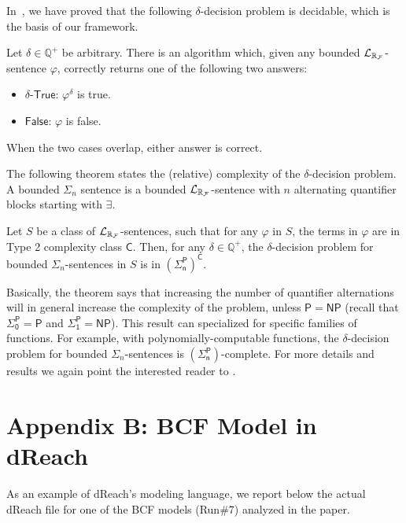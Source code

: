 In~\cite{gao12a}, we have proved that the following $\delta$-decision problem is decidable, which is the basis of our framework.
\begin{theorem}\label{delta-decide} Let $\delta\in\mathbb{Q}^+$ be
arbitrary. There is an algorithm which, given any bounded $\mathcal{L}_{\mathbb{R}_{\mathcal{F}}}$-sentence $\varphi$,
correctly returns one of the following two answers:
\begin{itemize}
\item $\delta$-$\mathsf{True}$: $\varphi^{\delta}$ is true.
\item $\mathsf{False}$: $\varphi$ is false.
\end{itemize}
When the two cases overlap, either answer is correct.
\end{theorem}
The following theorem states the (relative) complexity of the $\delta$-decision problem.
A bounded $\Sigma_n$ sentence is a bounded $\mathcal{L}_{\mathbb{R}_{\mathcal{F}}}$-sentence with $n$ alternating quantifier blocks 
starting with $\exists$. 
\begin{theorem}\label{compmain}
Let $S$ be a class of $\mathcal{L}_{\mathbb{R}_{\mathcal{F}}}$-sentences, such that for any $\varphi$ in $S$, the terms in $\varphi$ are in Type 2 complexity class $\mathsf{C}$. Then, for any $\delta\in \mathbb{Q}^+$, the $\delta$-decision problem for bounded $\Sigma_n$-sentences in $S$ is in $\mathsf{(\Sigma_n^P)^C}$.
\end{theorem}
Basically, the theorem says that increasing the number of quantifier alternations will in general increase 
the complexity of the problem, unless $\mathsf{P}=\mathsf{NP}$ (recall that $\mathsf{\Sigma_0^P}=\mathsf{P}$ 
and $\mathsf{\Sigma_1^P}=\mathsf{NP}$).
This result can specialized for specific families of functions. For example, with polynomially-computable 
functions, the $\delta$-decision problem for bounded $\Sigma_n$-sentences is $\mathsf{(\Sigma_n^P)}$-complete.
For more details and results we again point the interested reader to \cite{gao12b}.

\newpage
\section*{Appendix B: BCF Model in dReach}
As an example of dReach's modeling language, we report below the actual dReach file for one of 
the BCF models (Run\#7) analyzed in the paper.

